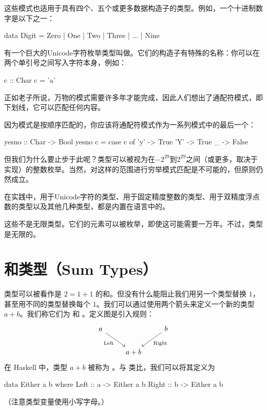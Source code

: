 \documentclass[DaoFP]{subfiles}
\begin{document}
这些模式也适用于具有四个、五个或更多数据构造子的类型。例如，一个十进制数字是以下之一：
\begin{haskell}
data Digit = Zero | One | Two | Three | ... | Nine
\end{haskell}

有一个巨大的Unicode字符枚举类型叫做。它们的构造子有特殊的名称：你可以在两个单引号之间写入字符本身，例如：
\begin{haskell}
c :: Char
c = 'a'
\end{haskell}

正如老子所说，万物的模式需要许多年才能完成，因此人们想出了通配符模式，即下划线，它可以匹配任何内容。

因为模式是按顺序匹配的，你应该将通配符模式作为一系列模式中的最后一个：
\begin{haskell}
yesno :: Char -> Bool
yesno c = case c of
  'y' -> True
  'Y' -> True
  _   -> False
\end{haskell}

但我们为什么要止步于此呢？类型可以被视为在$-2^{29}$到$2^{29}$之间（或更多，取决于实现）的整数枚举。当然，对这样的范围进行穷举模式匹配是不可能的，但原则仍然成立。

在实践中，用于Unicode字符的类型、用于固定精度整数的类型、用于双精度浮点数的类型以及其他几种类型，都是内置在语言中的。

这些不是无限类型。它们的元素可以被枚举，即使这可能需要一万年。不过，类型是无限的。

\section{和类型（Sum Types）}

 类型可以被看作是 $2 = 1 + 1$ 的和。但没有什么能阻止我们用另一个类型替换 $1$，甚至用不同的类型替换每个 $1$。我们可以通过使用两个箭头来定义一个新的类型 $a + b$。我们称它们为  和 。定义图是引入规则：
\[
 \begin{tikzcd}
 a
 \arrow[dr,  "\text{Left}"']
 && b
 \arrow[dl, "\text{Right}"]
 \\
&a + b
 \end{tikzcd}
\]
在 Haskell 中，类型 $a + b$ 被称为 。与  类比，我们可以将其定义为
\begin{haskell}
data Either a b where
  Left  :: a -> Either a b
  Right :: b -> Either a b
\end{haskell}
（注意类型变量使用小写字母。）
\end{document}
